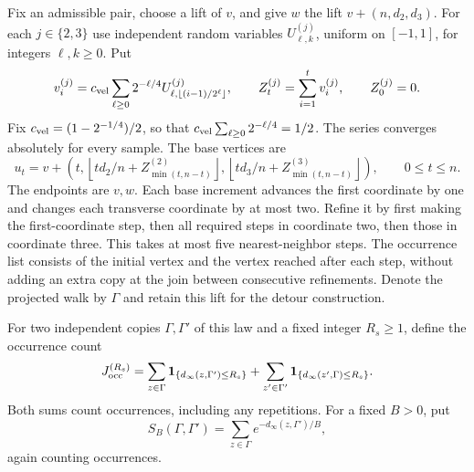 Fix an admissible pair, choose a lift of $v$, and give $w$ the lift
$v+(n,d_2,d_3)$. For each $j\in\{2,3\}$ use independent random variables
$U^{(j)}_{\ell,k}$, uniform on $[-1,1]$, for integers $\ell,k\ge0$. Put
\begin{equation}\label{lattice:velocity-law}
 v_i^{(j)}=c_{\rm vel}\sum_{\ell\ge0}2^{-\ell/4}
             U^{(j)}_{\ell,\lfloor(i-1)/2^\ell\rfloor},
 \qquad Z_t^{(j)}=\sum_{i=1}^t v_i^{(j)},\qquad Z_0^{(j)}=0.
\end{equation}
Fix
$c_{\rm vel}=(1-2^{-1/4})/2$, so that
$c_{\rm vel}\sum_{\ell\ge0}2^{-\ell/4}=1/2$. The series converges
absolutely for every sample. The base vertices are
\begin{equation}\label{lattice:nominal}
 u_t=v+\left(t,
   \left\lfloor td_2/n+Z_{\min(t,n-t)}^{(2)}\right\rfloor,
   \left\lfloor td_3/n+Z_{\min(t,n-t)}^{(3)}\right\rfloor\right),
 \qquad 0\le t\le n.
\end{equation}
The endpoints are $v,w$. Each base increment advances the first coordinate
by one and changes each transverse coordinate by at most two. Refine it
by first making the first-coordinate step, then all required steps in
coordinate two, then those in coordinate three. This takes at most five
nearest-neighbor steps. The occurrence list consists of the initial vertex
and the vertex reached after each step, without adding an extra copy at
the join between consecutive refinements. Denote the projected walk by
$\Gamma$ and retain this lift for the detour construction.

For two independent copies $\Gamma,\Gamma'$ of this law and a fixed integer
$R_s\ge1$, define the occurrence count
\begin{equation}\label{lattice:occurrence-count}
 J_{\rm occ}^{(R_s)}=
 \sum_{z\in\Gamma}\mathbf 1_{\{d_\infty(z,\Gamma')\le R_s\}}
 +\sum_{z'\in\Gamma'}\mathbf 1_{\{d_\infty(z',\Gamma)\le R_s\}}.
\end{equation}
Both sums count occurrences, including any repetitions. For a fixed $B>0$,
put
\[
 S_B(\Gamma,\Gamma')=
       \sum_{z\in\Gamma}e^{-d_\infty(z,\Gamma')/B},
\]
again counting occurrences.

